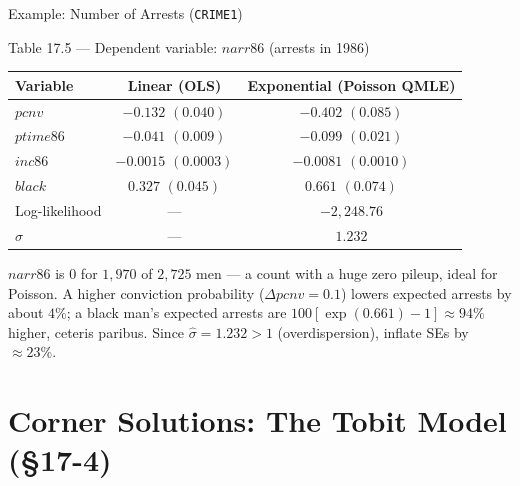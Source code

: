 \documentclass[aspectratio=169, 12pt]{beamer}
\begin{document}
\begin{frame}[shrink=8]{Example: Number of Arrests (\texttt{CRIME1})}

  \begin{examplebox}{Table 17.5 --- Dependent variable: $narr86$ (arrests in 1986)}
    \centering\footnotesize
    \begin{tabular}{l c c}
      \toprule
      Variable & Linear (OLS) & Exponential (Poisson QMLE) \\
      \midrule
      $pcnv$   & $-0.132$ $(0.040)$ & $-0.402$ $(0.085)$ \\
      $ptime86$& $-0.041$ $(0.009)$ & $-0.099$ $(0.021)$ \\
      $inc86$  & $-0.0015$ $(0.0003)$ & $-0.0081$ $(0.0010)$ \\
      $black$  & $0.327$ $(0.045)$  & $0.661$ $(0.074)$ \\
      \midrule
      Log-likelihood & --- & $-2{,}248.76$ \\
      $\hat\sigma$ & --- & $1.232$ \\
      \bottomrule
    \end{tabular}
  \end{examplebox}

  \begin{keybox}
    \small
    $narr86$ is $0$ for $1{,}970$ of $2{,}725$ men --- a count with a huge zero
    pileup, ideal for Poisson. A higher conviction probability
    ($\Delta pcnv = 0.1$) lowers expected arrests by about $4\%$; a black man's
    expected arrests are $100[\exp(0.661)-1]\approx 94\%$ higher, ceteris paribus.
    Since $\hat\sigma = 1.232 > 1$ (overdispersion), inflate SEs by $\approx 23\%$.
  \end{keybox}

\end{frame}

\section{Corner Solutions: The Tobit Model (\S17-4)}
\end{document}
